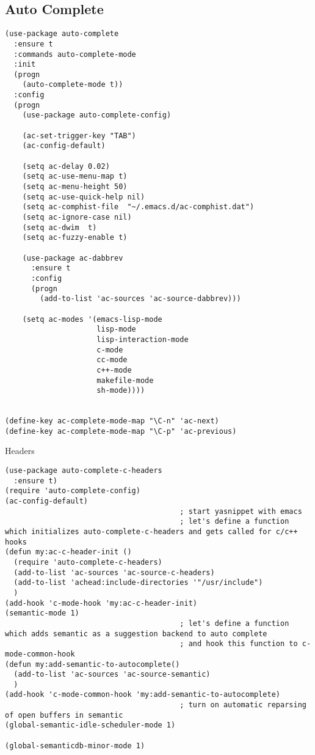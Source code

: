 \documentclass[12pt]{article}
\begin{document}
\subsection{Auto Complete}
\label{sec-7-2}

\lstset{language=Lisp,label= ,caption= ,numbers=none}
\begin{lstlisting}
(use-package auto-complete
  :ensure t  
  :commands auto-complete-mode
  :init
  (progn
    (auto-complete-mode t))
  :config
  (progn 
    (use-package auto-complete-config)

    (ac-set-trigger-key "TAB")
    (ac-config-default)

    (setq ac-delay 0.02)
    (setq ac-use-menu-map t)
    (setq ac-menu-height 50)
    (setq ac-use-quick-help nil) 
    (setq ac-comphist-file  "~/.emacs.d/ac-comphist.dat")
    (setq ac-ignore-case nil)
    (setq ac-dwim  t)
    (setq ac-fuzzy-enable t)

    (use-package ac-dabbrev
      :ensure t      
      :config
      (progn
        (add-to-list 'ac-sources 'ac-source-dabbrev)))

    (setq ac-modes '(emacs-lisp-mode
                     lisp-mode
                     lisp-interaction-mode
                     c-mode
                     cc-mode
                     c++-mode
                     makefile-mode
                     sh-mode))))


(define-key ac-complete-mode-map "\C-n" 'ac-next)
(define-key ac-complete-mode-map "\C-p" 'ac-previous)
\end{lstlisting}

Headers 
\lstset{language=Lisp,label= ,caption= ,numbers=none}
\begin{lstlisting}
(use-package auto-complete-c-headers
  :ensure t)
(require 'auto-complete-config)
(ac-config-default)
                                        ; start yasnippet with emacs
                                        ; let's define a function which initializes auto-complete-c-headers and gets called for c/c++ hooks
(defun my:ac-c-header-init ()
  (require 'auto-complete-c-headers)
  (add-to-list 'ac-sources 'ac-source-c-headers)
  (add-to-list 'achead:include-directories '"/usr/include")
  )
(add-hook 'c-mode-hook 'my:ac-c-header-init)
(semantic-mode 1)
                                        ; let's define a function which adds semantic as a suggestion backend to auto complete
                                        ; and hook this function to c-mode-common-hook
(defun my:add-semantic-to-autocomplete()
  (add-to-list 'ac-sources 'ac-source-semantic)
  )
(add-hook 'c-mode-common-hook 'my:add-semantic-to-autocomplete)
                                        ; turn on automatic reparsing of open buffers in semantic
(global-semantic-idle-scheduler-mode 1)

(global-semanticdb-minor-mode 1)
\end{lstlisting}
\end{document}
